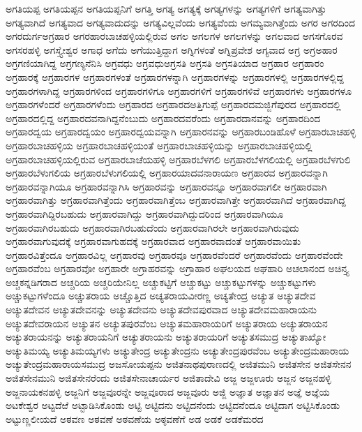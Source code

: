 {ಅಗತಿಯಪ್ಪ
ಅಗತಿಯಪ್ಪನ
ಅಗತಿಯಪ್ಪನಿಗೆ
ಅಗತ್ತಿ
ಅಗತ್ಯ
ಅಗತ್ಯಕ್ಕೆ
ಅಗತ್ಯಗಳನ್ನು
ಅಗತ್ಯಗಳಿಗೆ
ಅಗತ್ಯವಾಗಿತ್ತು
ಅಗತ್ಯವಾಗಿದೆ
ಅಗತ್ಯವಾದ
ಅಗತ್ಯವಾದುದನ್ನು
ಅಗತ್ಯವಿಲ್ಲವೆಂದು
ಅಗತ್ಯವೆಂದು
ಅಗಮ್ಯವಾಗಿತ್ತೆಂದು
ಅಗರ
ಅಗರದಿಂದ
ಅಗರದುರ್ಗಅಗ್ರಹಾರ
ಅಗರಹಾರಬಾಚಹಳ್ಳಿಯಲ್ಲಿರುವ
ಅಗಲ
ಅಗಲಗಳ
ಅಗಲಗಳನ್ನು
ಅಗಲವಾದ
ಅಗಸಗೊರವ
ಅಗಸರಹಳ್ಳಿ
ಅಗಸ್ತ್ಯೇಶ್ವರ
ಅಗಾಧ
ಅಗೆದು
ಅಗೆಯುತ್ತಿದ್ದಾಗ
ಅಗ್ನಿಗಳಂತೆ
ಅಗ್ನಿಪ್ರವೇಶ
ಅಗ್ಯವಾದ
ಅಗ್ರ
ಅಗ್ರಅಹಾರ
ಅಗ್ರಗಣಿಯಾಗಿದ್ದ
ಅಗ್ರಗಣ್ಯನೆನಿಸಿ
ಅಗ್ರವಧು
ಅಗ್ರವಧುಅಗ್ರಸತಿ
ಅಗ್ರಸತಿ
ಅಗ್ರಸತಿಯಾದ
ಅಗ್ರಹಾರ
ಅಗ್ರಹಾರಂ
ಅಗ್ರಹಾರಕ್ಕೆ
ಅಗ್ರಹಾರಗಳ
ಅಗ್ರಹಾರಗಳಂತೆ
ಅಗ್ರಹಾರಗಳನ್ನಾಗಿ
ಅಗ್ರಹಾರಗಳನ್ನು
ಅಗ್ರಹಾರಗಳಲ್ಲಿ
ಅಗ್ರಹಾರಗಳಲ್ಲಿದ್ದ
ಅಗ್ರಹಾರಗಳಾಗಿದ್ದ
ಅಗ್ರಹಾರಗಳಿಂದ
ಅಗ್ರಹಾರಗಳಿಗೂ
ಅಗ್ರಹಾರಗಳಿಗೆ
ಅಗ್ರಹಾರಗಳಿವೆ
ಅಗ್ರಹಾರಗಳು
ಅಗ್ರಹಾರಗಳೂ
ಅಗ್ರಹಾರಗಳೆಂದರೆ
ಅಗ್ರಹಾರಗಳೆಂದು
ಅಗ್ರಹಾರದ
ಅಗ್ರಹಾರದಅತ್ತಿಗುಪ್ಪೆ
ಅಗ್ರಹಾರದಮಜ್ಜಿಗೆಪುರದ
ಅಗ್ರಹಾರದಲ್ಲಿ
ಅಗ್ರಹಾರದಲ್ಲಿದ್ದ
ಅಗ್ರಹಾರದವನಾಗಿದ್ದನೆಂಬುದು
ಅಗ್ರಹಾರದವರೆಂದು
ಅಗ್ರಹಾರದಾನವನ್ನು
ಅಗ್ರಹಾರದಿಂದ
ಅಗ್ರಹಾರದ್ವಯ
ಅಗ್ರಹಾರದ್ವಯಂ
ಅಗ್ರಹಾರದ್ವಯವನ್ನಾಗಿ
ಅಗ್ರಹಾರನವನ್ನು
ಅಗ್ರಹಾರಬಂಡಿಹೊಳೆ
ಅಗ್ರಹಾರಬಾಚಹಳ್ಳಿ
ಅಗ್ರಹಾರಬಾಚಹಳ್ಳಿಯ
ಅಗ್ರಹಾರಬಾಚಹಳ್ಳಿಯಂತೆ
ಅಗ್ರಹಾರಬಾಚಹಳ್ಳಿಯನ್ನು
ಅಗ್ರಹಾರಬಾಚಹಳ್ಳಿಯಲ್ಲಿ
ಅಗ್ರಹಾರಬಾಚಹಳ್ಳಿಯಲ್ಲಿರುವ
ಅಗ್ರಹಾರಬಾಚೆಯಹಳ್ಳಿ
ಅಗ್ರಹಾರಬೆಳಗಲಿ
ಅಗ್ರಹಾರಬೆಳಗಲಿಯಲ್ಲಿ
ಅಗ್ರಹಾರಬೆಳಗುಲಿ
ಅಗ್ರಹಾರಬೆಳುಗಲಿಯ
ಅಗ್ರಹಾರಬೆಳುಗಲಿಯಲ್ಲಿ
ಅಗ್ರಹಾರಯಾದವನಾರಾಯಣ
ಅಗ್ರಹಾರವ
ಅಗ್ರಹಾರವನ್ನಾಗಿ
ಅಗ್ರಹಾರವನ್ನಾಗಿಯೂ
ಅಗ್ರಹಾರವನ್ನಾಗಿಸಿ
ಅಗ್ರಹಾರವನ್ನು
ಅಗ್ರಹಾರವನ್ನೂ
ಅಗ್ರಹಾರವಾಗಲೀ
ಅಗ್ರಹಾರವಾಗಿ
ಅಗ್ರಹಾರವಾಗಿತ್ತು
ಅಗ್ರಹಾರವಾಗಿತ್ತೆಂದು
ಅಗ್ರಹಾರವಾಗಿತ್ತೆಂಬ
ಅಗ್ರಹಾರವಾಗಿತ್ತೇ
ಅಗ್ರಹಾರವಾಗಿದೆ
ಅಗ್ರಹಾರವಾಗಿದ್ದ
ಅಗ್ರಹಾರವಾಗಿದ್ದಿರಬಹುದು
ಅಗ್ರಹಾರವಾಗಿದ್ದು
ಅಗ್ರಹಾರವಾಗಿದ್ದುದರಿಂದ
ಅಗ್ರಹಾರವಾಗಿಯೂ
ಅಗ್ರಹಾರವಾಗಿರಬಹುದು
ಅಗ್ರಹಾರವಾಗಿರಬಹುದೆಂದು
ಅಗ್ರಹಾರವಾಗಿರಲೇ
ಅಗ್ರಹಾರವಾಗಿರುವುದು
ಅಗ್ರಹಾರವಾಗುವುದಕ್ಕೆ
ಅಗ್ರಹಾರವಾಗುಹದಕ್ಕೆ
ಅಗ್ರಹಾರವಾದ
ಅಗ್ರಹಾರವಾದಂತೆ
ಅಗ್ರಹಾರವಾಯಿತು
ಅಗ್ರಹಾರವಿತ್ತೆಂದೂ
ಅಗ್ರಹಾರವಿಲ್ಲ
ಅಗ್ರಹಾರವು
ಅಗ್ರಹಾರವೂ
ಅಗ್ರಹಾರವೆಂದರೆ
ಅಗ್ರಹಾರವೆಂದು
ಅಗ್ರಹಾರವೆಂದೇ
ಅಗ್ರಹಾರವೆಂಬ
ಅಗ್ರಹಾರವೋ
ಅಗ್ರಹಾರೇ
ಅಗ್ರಾಹರವನ್ನು
ಅಗ್ರಾಹಾರ
ಅಘಲಯದ
ಅಘಹಾರಿ
ಅಚಲಾನಂದ
ಅಚಿನ್ತ್ಯ
ಅಚ್ಚಕನ್ನಡಿಗರಾದ
ಅಚ್ಚರಿಯ
ಅಚ್ಚರಿಯೇನಿಲ್ಲ
ಅಚ್ಚುಕಟ್ಟಿಗೆ
ಅಚ್ಚುಕಟ್ಟು
ಅಚ್ಚುಕಟ್ಟುಗಳನ್ನು
ಅಚ್ಚುಕಟ್ಟುಗಳು
ಅಚ್ಚುಕಟ್ಟುಗಳೆಂದೂ
ಅಚ್ಚುತರಾಯ
ಅಚ್ಚೊತ್ತಿದ
ಅಚ್ಯತರಾಯವೀರಣ್ಣ
ಅಚ್ಯತೇಂದ್ರ
ಅಚ್ಯುತ
ಅಚ್ಯುತದೇವ
ಅಚ್ಯುತದೇವನ
ಅಚ್ಯುತದೇವನನ್ನು
ಅಚ್ಯುತದೇವನು
ಅಚ್ಯುತದೇವಪುರವಾದ
ಅಚ್ಯುತದೇವಮಹಾರಾಯನು
ಅಚ್ಯುತದೇವರಾಯನ
ಅಚ್ಯುತನ
ಅಚ್ಯುತಪುರವೆಂಬ
ಅಚ್ಯುತಮಹಾರಾಯರಿಗೆ
ಅಚ್ಯುತರಾಯ
ಅಚ್ಯುತರಾಯನ
ಅಚ್ಯುತರಾಯನನ್ನು
ಅಚ್ಯುತರಾಯನಿಗೆ
ಅಚ್ಯುತರಾಯನು
ಅಚ್ಯುತರಾಯರಿಗೆ
ಅಚ್ಯುತಸಮುದ್ರ
ಅಚ್ಯುತಾಖ್ಯೋ
ಅಚ್ಯುತಿಮಯ್ಯ
ಅಚ್ಯುತಿಮಯ್ಯಗಳು
ಅಚ್ಯುತೇಂದ್ರ
ಅಚ್ಯುತೇಂದ್ರನು
ಅಚ್ಯುತೇಂದ್ರಪುರವೆಂಬ
ಅಚ್ಯುತೇಂದ್ರಮಹಾರಾಯ
ಅಚ್ಯುತೇಂದ್ರಮಹಾರಾಯಸಮುದ್ರ
ಅಜಸೋಯಪ್ಪನು
ಅಜಿತನಾಥಪುರಾಣದಲ್ಲಿ
ಅಜಿತಮುನಿ
ಅಜಿತಸೇನ
ಅಜಿತಸೇನನ
ಅಜಿತಸೇನಮುನಿ
ಅಜಿತಸೇನರೆಂದು
ಅಜಿತಸೇನಾಚಾರ್ಯರ
ಅಜಿತಾದೇವಿ
ಅಜ್ಜ
ಅಜ್ಜಊರು
ಅಜ್ಜನ
ಅಜ್ಜನಹಳ್ಳಿ
ಅಜ್ಜನಾಯಕನಹಳ್ಳಿ
ಅಜ್ಜನಿಗೆ
ಅಜ್ಜವೂರನ್ನೇ
ಅಜ್ಜವೂರಾದ
ಅಜ್ಜವೂರು
ಅಜ್ಜಿ
ಅಜ್ಞಾತ
ಅಜ್ಞಾತನ
ಅಜ್ಞೆ
ಅಜ್ಞೆಯ
ಅಟಕೇಶ್ವರ
ಅಟ್ಟದೆಱೆ
ಅಟ್ಟಾಡಿಸಿಕೊಂಡು
ಅಟ್ಟಿ
ಅಟ್ಟಿದನು
ಅಟ್ಟಿದನೆಂದು
ಅಟ್ಟಿದನೆಂದೂ
ಅಟ್ಟಿದಾಗ
ಅಟ್ಟಿಸಿಕೊಂಡು
ಅಟ್ಟುಣ್ಣಲೀಯದೆ
ಅಠವಣ
ಅಠವಣೆ
ಅಠವಣೆಯ
ಅಠ್ಠವಣೆಗೆ
ಅಡ
ಅಡಕೆ
ಅಡಕೆಮರದ
}
